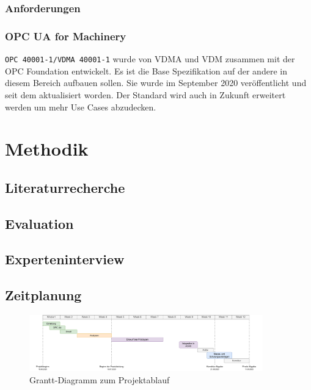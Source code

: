 \documentclass[a4paper, 12pt, oneside]{scrbook}
\begin{document}
		\subsection{Anforderungen}
		
		
		
		\subsection{OPC UA for Machinery}
		
		\texttt{OPC 40001-1/VDMA 40001-1} wurde von VDMA und VDM zusammen mit der OPC Foundation entwickelt. Es ist die Base Spezifikation auf der andere in diesem Bereich aufbauen sollen. Sie wurde im September 2020 veröffentlicht und seit dem aktualisiert worden. Der Standard wird auch in Zukunft erweitert werden um mehr Use Cases abzudecken.
		
		
			


\chapter{Methodik}\label{ch:Methodiken}
	
	
	
	\section{Literaturrecherche}
	
	\section{Evaluation}
	
	\section{Experteninterview}
	
	\section{Zeitplanung}
	
	\begin{figure}[H]
		\centering
		\includegraphics[width=0.9\textwidth]{res/analysen/Grantt-Diagramm.pdf}
		\caption{Grantt-Diagramm zum Projektablauf}
		\label{fig:Grantt}
	\end{figure}
	
\end{document}
